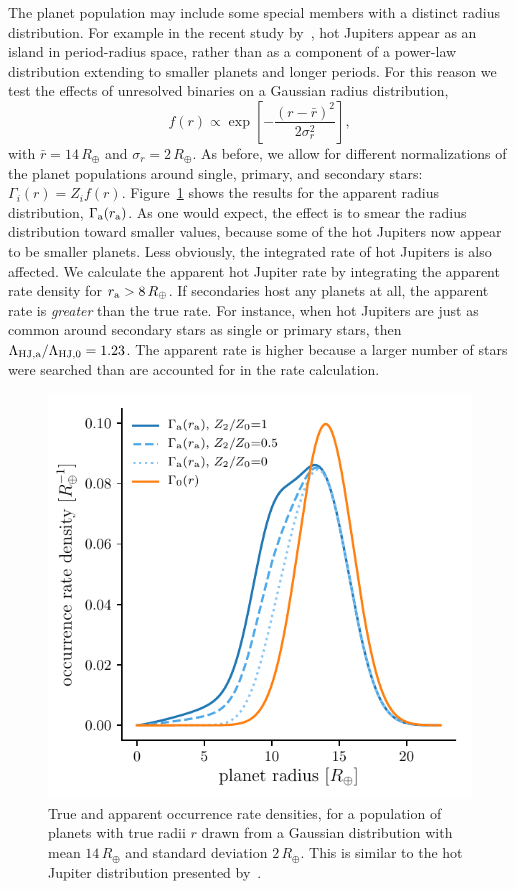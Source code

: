 \documentclass[12pt,modern]{aastex61}
\renewcommand{\a}{_{\rm a}}
\begin{document}
The planet population may include some special members with a distinct
radius distribution.  For example in the recent study
by~\citet{petigura_CKS_2017}, hot Jupiters appear as an island in
period-radius space, rather than as a component of a power-law
distribution extending to smaller planets and longer periods.
For this reason we test the effects of unresolved binaries
on a Gaussian radius distribution,
\begin{equation}
    f(r) \propto \exp \left[ -\frac{(r-\bar{r})^2}{2\sigma_r^2} \right],
\end{equation}
with $\bar{r} = 14\,R_\oplus$ and $\sigma_r = 2\,R_\oplus$.  As before,
we allow for different normalizations of the planet populations around
single, primary, and secondary stars: $\Gamma_i(r) = Z_i f(r)$.
Figure~\ref{fig:gaussian_HJ} shows the results for the apparent radius
distribution, $\Gamma\a(r\a)$.  As one would expect, the effect is to
smear the radius distribution toward smaller values, because some of
the hot Jupiters now appear to be smaller planets.  Less obviously,
the integrated rate of hot Jupiters is also affected.  We calculate
the apparent hot Jupiter rate by integrating the apparent rate density
for $r\a > 8\,R_\oplus$.  If secondaries host any planets at all, the
apparent rate is {\it greater} than the true rate.  For instance, when
hot Jupiters are just as common around secondary stars as single or primary
stars, then $\Lambda_{\rm HJ,a}/\Lambda_{{\rm HJ},0} = 1.23$.
The apparent rate is higher because a larger number of stars were
searched than are accounted for in the rate calculation.

\begin{figure}[!tb]
    \centering
    \includegraphics[width=.6\textwidth]{figures/int_rate_density_vs_radius_model_7_rpu_22.5_manyZs.pdf}
    \caption{ True and apparent occurrence rate densities, for a
      population of planets with true radii $r$ drawn from a Gaussian distribution
      with mean $14\,R_\oplus$ and standard deviation $2\,R_\oplus$.  This
      is similar to the hot Jupiter distribution presented
      by~\citet{petigura_CKS_2017}.  }
    \label{fig:gaussian_HJ}
\end{figure}
\end{document}
